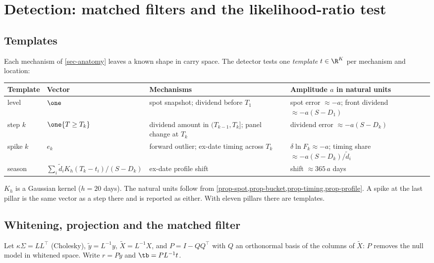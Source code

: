 \section{Detection: matched filters and the likelihood-ratio test}\label{sec-detection}

\subsection{Templates}
Each mechanism of \cref{sec-anatomy} leaves a known shape in carry space. The detector tests one \emph{template}
$t\in\R^K$ per mechanism and location:
\begin{center}\small
\begin{tabular}{lp{3.3cm}p{4.3cm}p{4.6cm}}
\toprule
Template & Vector & Mechanisms & Amplitude $a$ in natural units\\
\midrule
level & $\one$ & spot snapshot; dividend before $T_1$ & spot error $\approx-a$; front dividend $\approx-a(S-D_1)$\\
step $k$ & $\one\{T\ge T_k\}$ & dividend amount in $(T_{k-1},T_k]$; panel change at $T_k$ & dividend error $\approx-a(S-D_k)$\\
spike $k$ & $e_k$ & forward outlier; ex-date timing across $T_k$ & $\delta\ln F_k\approx-a$; timing share $\approx-a(S-D_k)/\tilde d_i$\\
season & $\sum_i\tilde d_iK_h(T_k-t_i)/(S-D_k)$ & ex-date profile shift & shift $\approx365\,a$ days\\
\bottomrule
\end{tabular}
\end{center}
$K_h$ is a Gaussian kernel ($h=20$ days). The natural units follow from \cref{prop-spot,prop-bucket,prop-timing,prop-profile}.
A spike at the last pillar is the same vector as a step there and is reported as either. With eleven pillars there
are \vNTemplates{} templates.

\subsection{Whitening, projection and the matched filter}
Let $\kappa\Sigma=LL^\top$ (Cholesky), $\tilde y=L^{-1}y$, $\tilde X=L^{-1}X$, and $P=I-QQ^\top$ with $Q$ an orthonormal
basis of the columns of $\tilde X$: $P$ removes the null model in whitened space. Write $r=P\tilde y$ and
$\tb=PL^{-1}t$.

